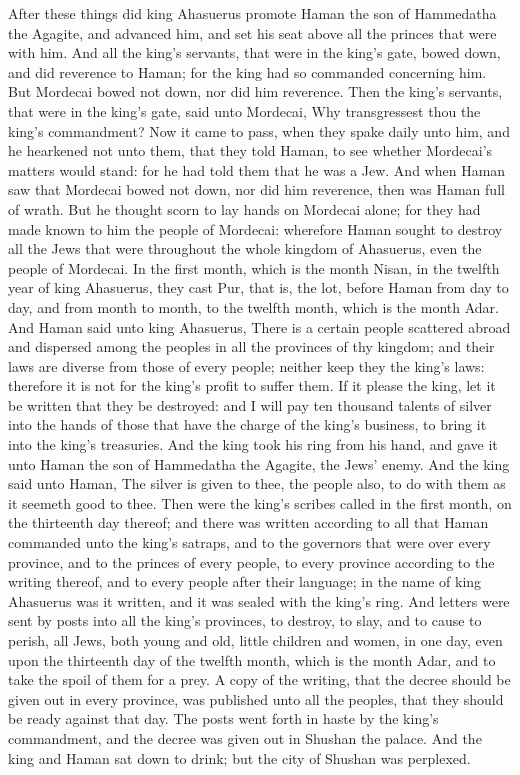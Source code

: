 After these things did king Ahasuerus promote Haman the son of Hammedatha the Agagite, and advanced him, and set his seat above all the princes that were with him. And all the king’s servants, that were in the king’s gate, bowed down, and did reverence to Haman; for the king had so commanded concerning him. But Mordecai bowed not down, nor did him reverence. Then the king’s servants, that were in the king’s gate, said unto Mordecai, Why transgressest thou the king’s commandment? Now it came to pass, when they spake daily unto him, and he hearkened not unto them, that they told Haman, to see whether Mordecai’s matters would stand: for he had told them that he was a Jew. And when Haman saw that Mordecai bowed not down, nor did him reverence, then was Haman full of wrath. But he thought scorn to lay hands on Mordecai alone; for they had made known to him the people of Mordecai: wherefore Haman sought to destroy all the Jews that were throughout the whole kingdom of Ahasuerus, even the people of Mordecai.  In the first month, which is the month Nisan, in the twelfth year of king Ahasuerus, they cast Pur, that is, the lot, before Haman from day to day, and from month to month, to the twelfth month, which is the month Adar. And Haman said unto king Ahasuerus, There is a certain people scattered abroad and dispersed among the peoples in all the provinces of thy kingdom; and their laws are diverse from those of every people; neither keep they the king’s laws: therefore it is not for the king’s profit to suffer them. If it please the king, let it be written that they be destroyed: and I will pay ten thousand talents of silver into the hands of those that have the charge of the king’s business, to bring it into the king’s treasuries. And the king took his ring from his hand, and gave it unto Haman the son of Hammedatha the Agagite, the Jews’ enemy. And the king said unto Haman, The silver is given to thee, the people also, to do with them as it seemeth good to thee.  Then were the king’s scribes called in the first month, on the thirteenth day thereof; and there was written according to all that Haman commanded unto the king’s satraps, and to the governors that were over every province, and to the princes of every people, to every province according to the writing thereof, and to every people after their language; in the name of king Ahasuerus was it written, and it was sealed with the king’s ring. And letters were sent by posts into all the king’s provinces, to destroy, to slay, and to cause to perish, all Jews, both young and old, little children and women, in one day, even upon the thirteenth day of the twelfth month, which is the month Adar, and to take the spoil of them for a prey. A copy of the writing, that the decree should be given out in every province, was published unto all the peoples, that they should be ready against that day. The posts went forth in haste by the king’s commandment, and the decree was given out in Shushan the palace. And the king and Haman sat down to drink; but the city of Shushan was perplexed. 

